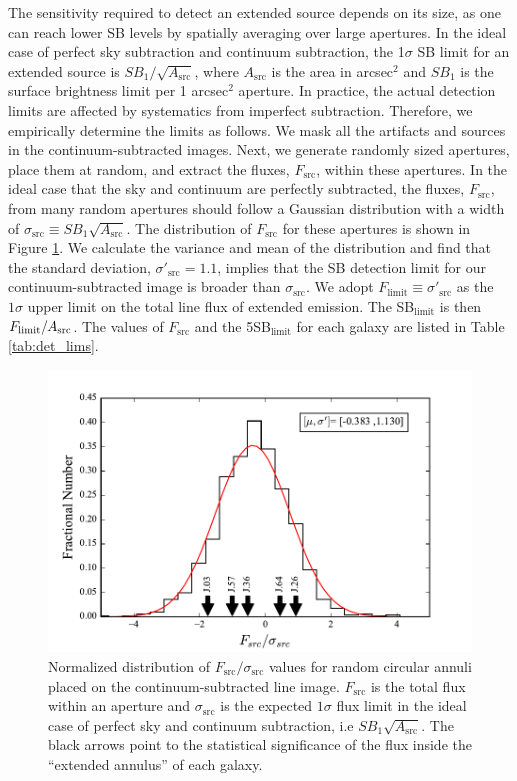 \documentclass[twocolumn]{aastex61}
\begin{document}
The sensitivity required to detect an extended source depends on its size, as one can reach lower SB levels by spatially averaging over large apertures. In the ideal case of perfect sky subtraction and continuum subtraction, the 1$\sigma$ SB limit for an extended source is $SB_{1}/\sqrt{A_\text{src}}$, where $A_\text{src}$ is the area in arcsec$^2$ and $SB_{1}$ is the surface brightness limit per 1 arcsec$^2$ aperture. In practice, the actual detection limits are affected by systematics from imperfect subtraction. Therefore, we empirically determine the limits as follows. We mask all the artifacts and sources in the continuum-subtracted images. Next, we generate randomly sized apertures, place them at random, and extract the fluxes, $F_{\text{src}}$, within these apertures. In the ideal case that the sky and continuum are perfectly subtracted, the fluxes, $F_{\text{src}}$, from many random apertures should follow a Gaussian distribution with a width of $\sigma_{\text{src}} \equiv SB_{1}\sqrt{A_\text{src}}$. The distribution of $F_{\text{src}}$ for these apertures is shown in Figure \ref{fig:limits}.
We calculate the variance and mean of the distribution and find that the standard deviation, $\sigma'_{\text{src}}=1.1$, 
implies that the SB detection limit for our continuum-subtracted image is broader than 
 $\sigma_{\text{src}}$. We adopt $F_{\text{limit}} \equiv \sigma'_{\text{src}}$  as the $1 \sigma$ upper limit on the total line flux of extended  emission. The SB$_{\text{limit}}$ is then $F_{\text{limit}}/A_{\rm{src}}$. The values of $F_{\text{src}}$ and the 5SB$_{\text{limit}}$ for each galaxy are listed in Table \ref{tab:det_lims}.

\begin{figure}[!ht]
\centering
\includegraphics[scale=0.6]{../Figures/hist_sblim.pdf}
\caption{Normalized distribution of $F_{\text{src}}/\sigma_{\text{src}}$ values for random circular annuli placed on the continuum-subtracted line image. $F_{\text{src}}$ is the total flux within an aperture and $\sigma_{\text{src}}$ is the expected $1\sigma$ flux limit in the ideal case of perfect sky and continuum subtraction, i.e $SB_{1}\sqrt{A_\text{src}}$. The black arrows point to the statistical significance of the flux inside the ``extended annulus'' of each galaxy.}
\label{fig:limits}
\end{figure}
\end{document}
